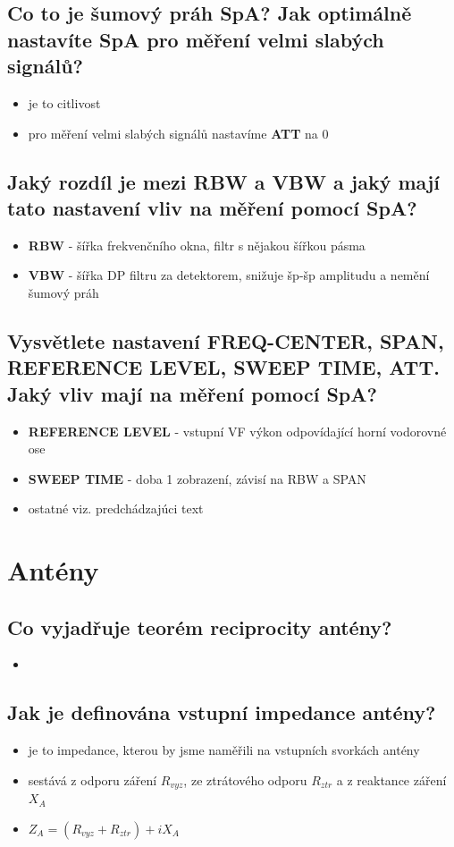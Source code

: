 \documentclass[a4paper,czech]{article}
\begin{document}
\subsection{\textbf{Co to je šumový práh SpA? Jak optimálně nastavíte SpA pro měření velmi slabých signálů?}}
\begin{itemize}
	\item je to citlivost
	\item pro měření velmi slabých signálů nastavíme \textbf{ATT} na 0
\end{itemize}
\subsection{\textbf{Jaký rozdíl je mezi RBW a VBW a jaký mají tato nastavení vliv na měření pomocí SpA?}}
\begin{itemize}
	\item \textbf{RBW} - šířka frekvenčního okna, filtr s nějakou šířkou pásma
	\item \textbf{VBW} - šířka DP filtru za detektorem, snižuje šp-šp amplitudu a nemění šumový práh
\end{itemize}
\subsection{\textbf{Vysvětlete nastavení FREQ-CENTER, SPAN, REFERENCE LEVEL, SWEEP TIME, ATT. Jaký vliv mají na měření pomocí SpA?}}
\begin{itemize}
	\item \textbf{REFERENCE LEVEL} - vstupní VF výkon odpovídající horní vodorovné ose
	\item \textbf{SWEEP TIME} - doba 1 zobrazení, závisí na RBW a SPAN
	\item ostatné viz. predchádzajúci text
\end{itemize}

\section{Antény}
\subsection{\textbf{Co vyjadřuje teorém reciprocity antény?}}
\begin{itemize}
	\item 
\end{itemize}
\subsection{\textbf{Jak je definována vstupní impedance antény?}}
\begin{itemize}
	\item je to impedance, kterou by jsme naměřili na vstupních svorkách antény
	\item sestává z odporu záření $R_{vyz}$, ze ztrátového odporu $R_{ztr}$ a z reaktance záření $X_A$
	\item $Z_A = (R_{vyz} + R_{ztr}) + iX_A$
\end{itemize}
\end{document}
